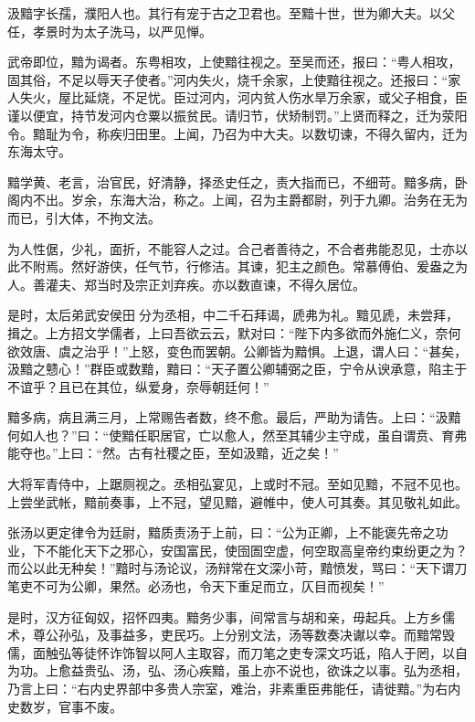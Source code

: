 \documentclass[12pt,UTF8]{ctexbook}
\begin{document}
汲黯字长孺，濮阳人也。其行有宠于古之卫君也。至黯十世，世为卿大夫。以父任，孝景时为太子洗马，以严见惮。



武帝即位，黯为谒者。东粤相攻，上使黯往视之。至吴而还，报曰：“粤人相攻，固其俗，不足以辱天子使者。”河内失火，烧千余家，上使黯往视之。还报曰：“家人失火，屋比延烧，不足忧。臣过河内，河内贫人伤水旱万余家，或父子相食，臣谨以便宜，持节发河内仓粟以振贫民。请归节，伏矫制罚。”上贤而释之，迁为荥阳令。黯耻为令，称疾归田里。上闻，乃召为中大夫。以数切谏，不得久留内，迁为东海太守。



黯学黄、老言，治官民，好清静，择丞史任之，责大指而已，不细苛。黯多病，卧阁内不出。岁余，东海大治，称之。上闻，召为主爵都尉，列于九卿。治务在无为而已，引大体，不拘文法。



为人性倨，少礼，面折，不能容人之过。合己者善待之，不合者弗能忍见，士亦以此不附焉。然好游侠，任气节，行修洁。其谏，犯主之颜色。常慕傅伯、爰盎之为人。善灌夫、郑当时及宗正刘弃疾。亦以数直谏，不得久居位。



是时，太后弟武安侯田分为丞相，中二千石拜谒，虒弗为礼。黯见虒，未尝拜，揖之。上方招文学儒者，上曰吾欲云云，默对曰：“陛下内多欲而外施仁义，奈何欲效唐、虞之治乎！”上怒，变色而罢朝。公卿皆为黯惧。上退，谓人曰：“甚矣，汲黯之戆心！”群臣或数黯，黯曰：“天子置公卿辅弼之臣，宁令从谀承意，陷主于不谊乎？且已在其位，纵爱身，奈辱朝廷何！”



黯多病，病且满三月，上常赐告者数，终不愈。最后，严助为请告。上曰：“汲黯何如人也？”曰：“使黯任职居官，亡以愈人，然至其辅少主守成，虽自谓贲、育弗能夺也。”上曰：“然。古有社稷之臣，至如汲黯，近之矣！”



大将军青侍中，上踞厕视之。丞相弘宴见，上或时不冠。至如见黯，不冠不见也。上尝坐武帐，黯前奏事，上不冠，望见黯，避帷中，使人可其奏。其见敬礼如此。



张汤以更定律令为廷尉，黯质责汤于上前，曰：“公为正卿，上不能褒先帝之功业，下不能化天下之邪心，安国富民，使囹圄空虚，何空取高皇帝约束纷更之为？而公以此无种矣！”黯时与汤论议，汤辩常在文深小苛，黯愤发，骂曰：“天下谓刀笔吏不可为公卿，果然。必汤也，令天下重足而立，仄目而视矣！”



是时，汉方征匈奴，招怀四夷。黯务少事，间常言与胡和亲，毋起兵。上方乡儒术，尊公孙弘，及事益多，吏民巧。上分别文法，汤等数奏决谳以幸。而黯常毁儒，面触弘等徒怀诈饰智以阿人主取容，而刀笔之吏专深文巧诋，陷人于罔，以自为功。上愈益贵弘、汤，弘、汤心疾黯，虽上亦不说也，欲诛之以事。弘为丞相，乃言上曰：“右内史界部中多贵人宗室，难治，非素重臣弗能任，请徙黯。”为右内史数岁，官事不废。
\end{document}

